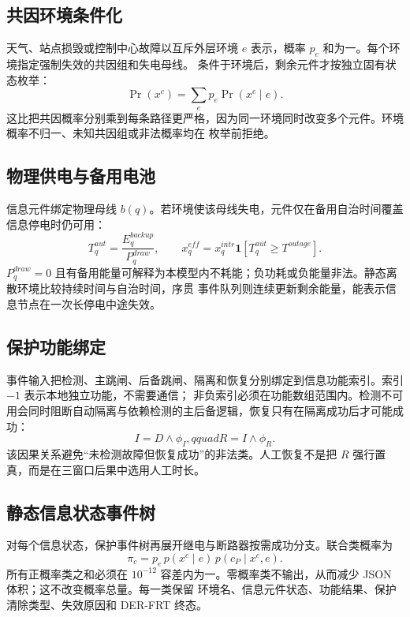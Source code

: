 \subsection{共因环境条件化}
天气、站点损毁或控制中心故障以互斥外层环境 $e$ 表示，概率 $p_e$ 和为一。每个环境指定强制失效的共因组和失电母线。
条件于环境后，剩余元件才按独立固有状态枚举：
\begin{equation}
 \Pr(x^c)=\sum_ep_e\Pr(x^c\mid e).
\end{equation}
这比把共因概率分别乘到每条路径更严格，因为同一环境同时改变多个元件。环境概率不归一、未知共因组或非法概率均在
枚举前拒绝。

\subsection{物理供电与备用电池}
信息元件绑定物理母线 $b(q)$。若环境使该母线失电，元件仅在备用自治时间覆盖信息停电时仍可用：
\begin{equation}
 T_q^{aut}=\frac{E_q^{backup}}{P_q^{draw}},\qquad
 x_q^{eff}=x_q^{intr}\mathbf1[T_q^{aut}\ge T^{outage}].
\end{equation}
$P_q^{draw}=0$ 且有备用能量可解释为本模型内不耗能；负功耗或负能量非法。静态离散环境比较持续时间与自治时间，序贯
事件队列则连续更新剩余能量，能表示信息节点在一次长停电中途失效。

\subsection{保护功能绑定}
事件输入把检测、主跳闸、后备跳闸、隔离和恢复分别绑定到信息功能索引。索引 $-1$ 表示本地独立功能，不需要通信；
非负索引必须在功能数组范围内。检测不可用会同时阻断自动隔离与依赖检测的主后备逻辑，恢复只有在隔离成功后才可能成功：
\begin{equation}
 I=D\land\phi_I,qquad R=I\land\phi_R.
\end{equation}
该因果关系避免“未检测故障但恢复成功”的非法类。人工恢复不是把 $R$ 强行置真，而是在三窗口后果中选用人工时长。

\subsection{静态信息状态事件树}
对每个信息状态，保护事件树再展开继电与断路器按需成功分支。联合类概率为
\begin{equation}
 \pi_c=p_e\,p(x^c\mid e)\,p(c_P\mid x^c,e).
\end{equation}
所有正概率类之和必须在 $10^{-12}$ 容差内为一。零概率类不输出，从而减少 JSON 体积；这不改变概率总量。每一类保留
环境名、信息元件状态、功能结果、保护清除类型、失效原因和 DER-FRT 终态。

